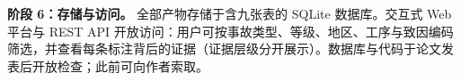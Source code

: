 \documentclass[11pt]{article}
\begin{document}
\textbf{{\cjkfont 阶\allowbreak 段} 6{\cjkfont ：\allowbreak 存\allowbreak 储\allowbreak 与\allowbreak 访\allowbreak 问\allowbreak 。}} {\cjkfont 全\allowbreak 部\allowbreak 产\allowbreak 物\allowbreak 存\allowbreak 储\allowbreak 于\allowbreak 含\allowbreak 九\allowbreak 张\allowbreak 表\allowbreak 的} SQLite {\cjkfont 数\allowbreak 据\allowbreak 库\allowbreak 。\allowbreak 交\allowbreak 互\allowbreak 式} Web {\cjkfont 平\allowbreak 台\allowbreak 与} REST API {\cjkfont 开\allowbreak 放\allowbreak 访\allowbreak 问\allowbreak ：\allowbreak 用\allowbreak 户\allowbreak 可\allowbreak 按\allowbreak 事\allowbreak 故\allowbreak 类\allowbreak 型\allowbreak 、\allowbreak 等\allowbreak 级\allowbreak 、\allowbreak 地\allowbreak 区\allowbreak 、\allowbreak 工\allowbreak 序\allowbreak 与\allowbreak 致\allowbreak 因\allowbreak 编\allowbreak 码\allowbreak 筛\allowbreak 选\allowbreak ，\allowbreak 并\allowbreak 查\allowbreak 看\allowbreak 每\allowbreak 条\allowbreak 标\allowbreak 注\allowbreak 背\allowbreak 后\allowbreak 的\allowbreak 证\allowbreak 据\allowbreak （\allowbreak 证\allowbreak 据\allowbreak 层\allowbreak 级\allowbreak 分\allowbreak 开\allowbreak 展\allowbreak 示\allowbreak ）\allowbreak 。\allowbreak 数\allowbreak 据\allowbreak 库\allowbreak 与\allowbreak 代\allowbreak 码\allowbreak 于\allowbreak 论\allowbreak 文\allowbreak 发\allowbreak 表\allowbreak 后\allowbreak 开\allowbreak 放\allowbreak 检\allowbreak 查\allowbreak ；\allowbreak 此\allowbreak 前\allowbreak 可\allowbreak 向\allowbreak 作\allowbreak 者\allowbreak 索\allowbreak 取\allowbreak 。}
\end{document}
